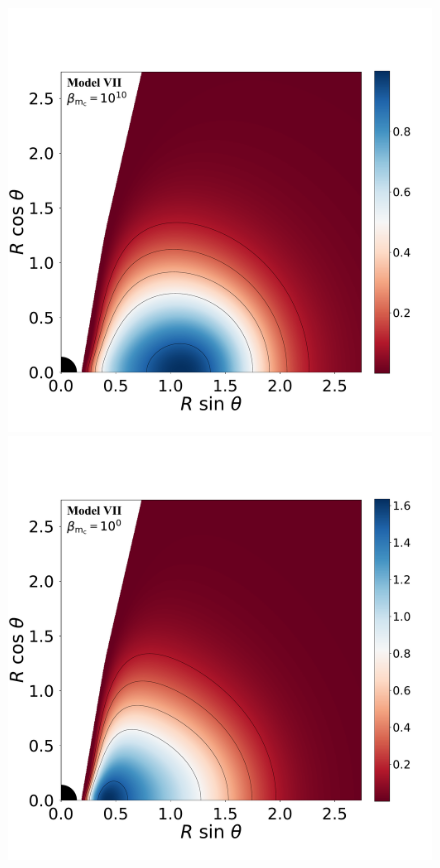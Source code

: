 \documentclass[twocolumn,aps,showpacs,showkeys,prd,superscriptaddress,byrevtex, amsmath]{revtex4-1}
\begin{document}
\begin{figure}
\\
\includegraphics[scale=0.14]{figures/fig4_VII_10.pdf}
\hspace{-0.3cm}
\includegraphics[scale=0.14]{figures/fig4_VII_1.pdf}

\end{figure}
\end{document}
